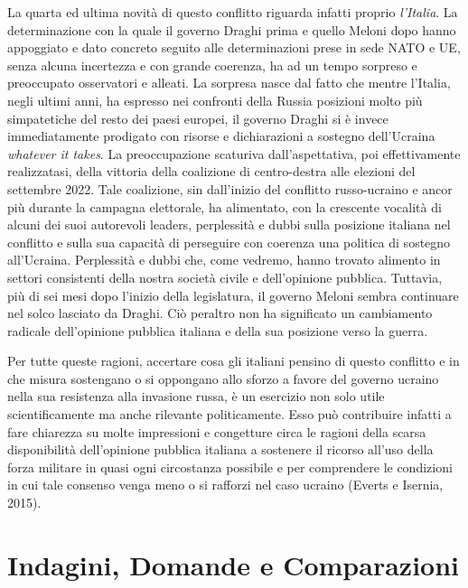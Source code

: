 \documentclass[
]{book}
\begin{document}
La quarta ed ultima novità di questo conflitto riguarda infatti proprio \emph{l'Italia}. La determinazione con la quale il governo Draghi prima e quello Meloni dopo hanno appoggiato e dato concreto seguito alle determinazioni prese in sede NATO e UE, senza alcuna incertezza e con grande coerenza, ha ad un tempo sorpreso e preoccupato osservatori e alleati. La sorpresa nasce dal fatto che mentre l'Italia, negli ultimi anni, ha espresso nei confronti della Russia posizioni molto più simpatetiche del resto dei paesi europei, il governo Draghi si è invece immediatamente prodigato con risorse e dichiarazioni a sostegno dell'Ucraina \emph{whatever it takes}. La preoccupazione scaturiva dall'aspettativa, poi effettivamente realizzatasi, della vittoria della coalizione di centro-destra alle elezioni del settembre 2022. Tale coalizione, sin dall'inizio del conflitto russo-ucraino e ancor più durante la campagna elettorale, ha alimentato, con la crescente vocalità di alcuni dei suoi autorevoli leaders, perplessità e dubbi sulla posizione italiana nel conflitto e sulla sua capacità di perseguire con coerenza una politica di sostegno all'Ucraina. Perplessità e dubbi che, come vedremo, hanno trovato alimento in settori consistenti della nostra società civile e dell'opinione pubblica. Tuttavia, più di sei mesi dopo l'inizio della legislatura, il governo Meloni sembra continuare nel solco lasciato da Draghi. Ciò peraltro non ha significato un cambiamento radicale dell'opinione pubblica italiana e della sua posizione verso la guerra.

Per tutte queste ragioni, accertare cosa gli italiani pensino di questo conflitto e in che misura sostengano o si oppongano allo sforzo a favore del governo ucraino nella sua resistenza alla invasione russa, è un esercizio non solo utile scientificamente ma anche rilevante politicamente. Esso può contribuire infatti a fare chiarezza su molte impressioni e congetture circa le ragioni della scarsa disponibilità dell'opinione pubblica italiana a sostenere il ricorso all'uso della forza militare in quasi ogni circostanza possibile e per comprendere le condizioni in cui tale consenso venga meno o si rafforzi nel caso ucraino (Everts e Isernia, 2015).

\hypertarget{indagini-domande-e-comparazioni}{%
\section{Indagini, Domande e Comparazioni}\label{indagini-domande-e-comparazioni}}
\end{document}
